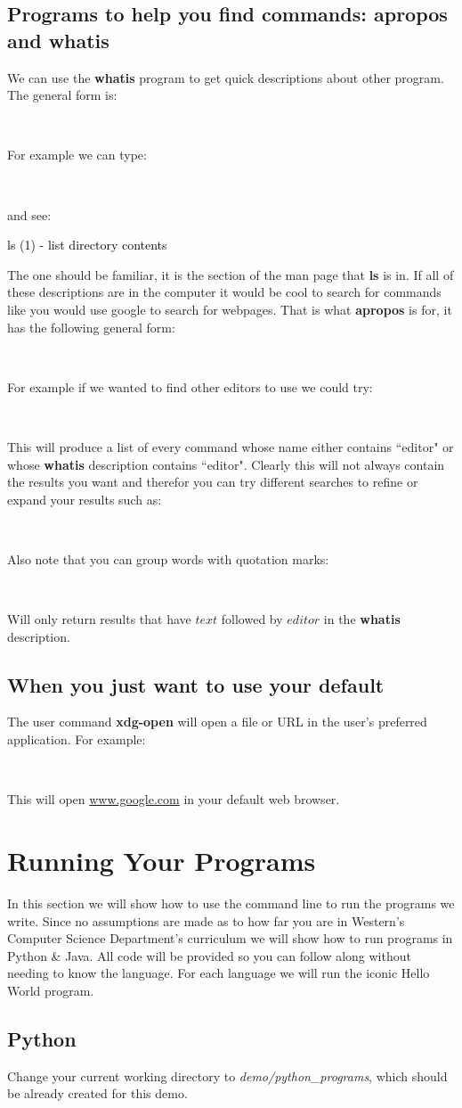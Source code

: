 \documentclass[oneside]{book}
\newcommand{\commandline}[1]{\begin{center} \colorbox{Dark}{\textcolor{white}{#1}} \end{center}}
\newcommand{\exampleout}[1]{\begin{center} \colorbox{Light}{\textcolor{black}{#1}} \end{center}}
\begin{document}
\subsection{Programs to help you find commands: \textbf{apropos} and \textbf{whatis}}
We can use the \textbf{whatis} program to get quick descriptions about other program. The general form is:
\commandline{whatis programname}
For example we can type:
\commandline{whatis ls}
and see:
\exampleout{ls (1)		- list directory contents}
The one should be familiar, it is the section of the man page that \textbf{ls} is in. If all of these descriptions are in the computer it would be cool to search for commands like you would use google to search for webpages.
That is what \textbf{apropos} is for, it has the following general form:
\commandline{apropos whatToSearchFor}
For example if we wanted to find other editors to use we could try:
\commandline{apropos editor}
This will produce a list of every command whose name either contains ``editor" or whose \textbf{whatis} description contains ``editor". Clearly this will not always contain the results you want and therefor you can try different searches to refine or expand your results such as:
\commandline{apropos text editor}
Also note that you can group words with quotation marks:
\commandline{apropos ``text editor"} 
Will only return results that have $text$ followed by $editor$ in the \textbf{whatis} description.

\subsection{When you just want to use your default}
The user command \textbf{xdg-open} will open a file or URL in the user's preferred application. For example:
\commandline{xdg-open `https://www.google.com'}

This will open \url{www.google.com} in your default web browser.

\section{Running Your Programs}
In this section we will show how to use the command line to run the programs we write. Since no assumptions are made as to how far you are in Western's Computer Science Department's curriculum we will show how to run programs in Python \& Java. All code will be provided so you can follow along without needing to know the language. For each language we will run the iconic Hello World program.
\subsection{Python}
Change your current working directory to \textit{demo/python\_programs}, which should be already created for this demo.
\end{document}
